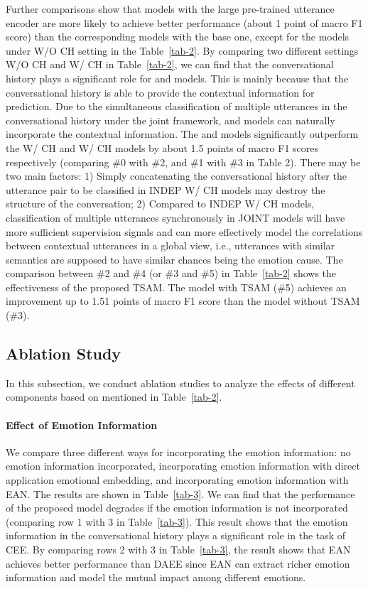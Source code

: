 \documentclass[11pt]{article}
\begin{document}
 
Further comparisons show that models with the large pre-trained utterance encoder are more likely to achieve better performance (about 1 point of macro F1 score) than the corresponding models with the base one, except for the models under W/O CH setting in the Table~\ref{tab-2}. 
By comparing two different settings W/O CH and W/ CH in Table~\ref{tab-2}, we can find that the conversational history plays a significant role for  and  models. This is mainly because that the conversational history is able to provide the contextual information for prediction. 
Due to the simultaneous classification of multiple utterances in the conversational history under the joint framework,  and  models can naturally incorporate the contextual information. 
The  and  models significantly outperform the  W/ CH and  W/ CH models by about 1.5 points of macro F1 scores respectively (comparing \#0 with \#2, and \#1 with \#3 in Table 2). There may be two main factors: 1) Simply concatenating the conversational history after the utterance pair to be classified in INDEP W/ CH models may destroy the structure of the conversation; 2) Compared to INDEP W/ CH models, classification of multiple utterances synchronously in JOINT models will have more sufficient supervision signals and can more effectively model the correlations between contextual utterances in a global view, i.e., utterances with similar semantics are supposed to have similar chances being the emotion cause.
The comparison between \#2 and \#4 (or \#3 and \#5) in Table~\ref{tab-2} shows the effectiveness of the proposed TSAM. The model with TSAM (\#5) achieves an improvement up to 1.51 points of macro F1 score than the model without TSAM (\#3).     


\subsection{Ablation Study}
In this subsection, we conduct ablation studies to analyze the effects of different components based on  mentioned in Table~\ref{tab-2}.


\paragraph{Effect of Emotion Information}

We compare three different ways for incorporating the emotion information: no emotion information incorporated, incorporating emotion information with direct application emotional embedding, and incorporating emotion information with EAN. The results are shown in Table~\ref{tab-3}.
We can find that the performance of the proposed model degrades if the emotion information is not incorporated (comparing row 1 with 3 in Table~\ref{tab-3}). This result shows that the emotion information in the conversational history plays a significant role in the task of CEE. By comparing rows 2 with 3 in Table~\ref{tab-3}, the result shows that EAN achieves better performance than DAEE since EAN can extract richer emotion information and model the mutual impact among different emotions.
\end{document}

